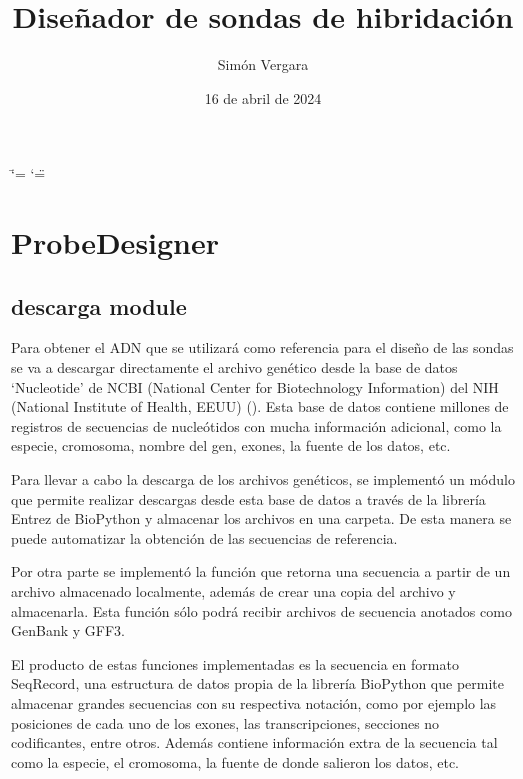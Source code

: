 \documentclass[letterpaper,10pt,spanish]{sphinxmanual}
\title{Diseñador de sondas de hibridación}
\date{16 de abril de 2024}
\author{Simón Vergara}
\begin{document}
\ifdefined\shorthandoff
  \ifnum\catcode`\=\string=\active\shorthandoff{=}\fi
  \ifnum\catcode`\"=\active{}\fi
\fi

\pagestyle{empty}
\sphinxmaketitle
\pagestyle{plain}
\sphinxtableofcontents
\pagestyle{normal}
\label{\detokenize{index::doc}}


\sphinxstepscope


\chapter{Probe\sphinxhyphen{}Designer}
\label{\detokenize{modules:probe-designer}}\label{\detokenize{modules::doc}}
\sphinxstepscope


\section{descarga module}
\label{\detokenize{descarga:descarga-module}}\label{\detokenize{descarga::doc}}
\sphinxAtStartPar
Para obtener el ADN que se utilizará como referencia para el diseño de las sondas se va a descargar directamente el archivo genético desde la base de datos ‘Nucleotide’ de NCBI (National Center for Biotechnology Information) del NIH (National Institute of Health, EEUU) (). Esta base de datos contiene millones de registros de secuencias de nucleótidos con mucha información adicional, como la especie, cromosoma, nombre del gen, exones, la fuente de los datos, etc.

\sphinxAtStartPar
Para llevar a cabo la descarga de los archivos genéticos, se implementó un módulo que permite realizar descargas desde esta base de datos a través de la librería Entrez de BioPython y almacenar los archivos en una carpeta. De esta manera se puede automatizar la obtención de las secuencias de referencia.

\sphinxAtStartPar
Por otra parte se implementó la función que retorna una secuencia a partir de un archivo almacenado localmente, además de crear una copia del archivo y almacenarla. Esta función sólo podrá recibir archivos de secuencia anotados como GenBank y GFF3.

\sphinxAtStartPar
El producto de estas funciones implementadas es la secuencia en formato SeqRecord, una estructura de datos propia de la librería BioPython que permite almacenar grandes secuencias con su respectiva notación, como por ejemplo las posiciones de cada uno de los exones, las transcripciones, secciones no codificantes, entre otros. Además contiene información extra de la secuencia tal como la especie, el cromosoma, la fuente de donde salieron los datos, etc.
\label{\detokenize{descarga:module-descarga}}
\end{document}
